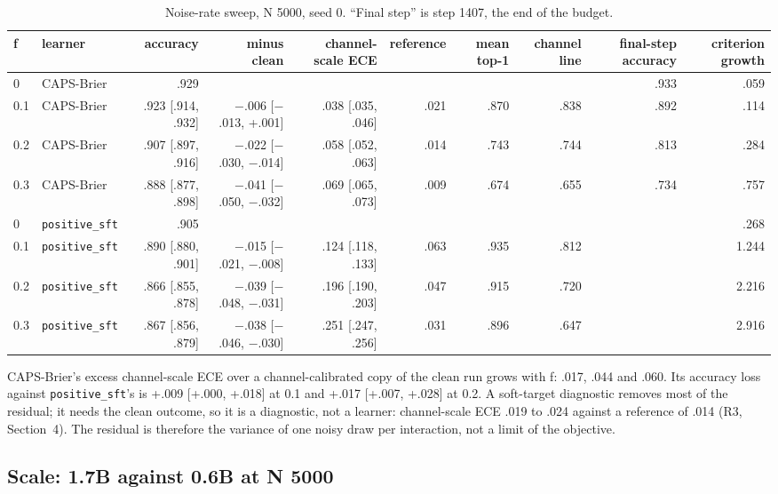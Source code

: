 \documentclass[10pt,letterpaper]{article}
\theoremstyle{plain}
\begin{document}
\begin{table}[H]
\centering
\footnotesize
\setlength{\tabcolsep}{3pt}
\caption{Noise-rate sweep, N 5000, seed 0. ``Final step'' is step 1407, the end of the budget.}
\label{tab:A4}
\begin{adjustbox}{max width=\textwidth}
\begin{tabular}{llrrrrrrrr}
\toprule
f & learner & accuracy & minus clean & channel-scale ECE & reference & mean top-1 & channel line & final-step accuracy & criterion growth \\
\midrule
0 & CAPS-Brier & .929 &  &  &  &  &  & .933 & .059 \\
0.1 & CAPS-Brier & .923 [.914, .932] & $-$.006 [$-$.013, +.001] & .038 [.035, .046] & .021 & .870 & .838 & .892 & .114 \\
0.2 & CAPS-Brier & .907 [.897, .916] & $-$.022 [$-$.030, $-$.014] & .058 [.052, .063] & .014 & .743 & .744 & .813 & .284 \\
0.3 & CAPS-Brier & .888 [.877, .898] & $-$.041 [$-$.050, $-$.032] & .069 [.065, .073] & .009 & .674 & .655 & .734 & .757 \\
0 & \texttt{positive\_sft} & .905 &  &  &  &  &  &  & .268 \\
0.1 & \texttt{positive\_sft} & .890 [.880, .901] & $-$.015 [$-$.021, $-$.008] & .124 [.118, .133] & .063 & .935 & .812 &  & 1.244 \\
0.2 & \texttt{positive\_sft} & .866 [.855, .878] & $-$.039 [$-$.048, $-$.031] & .196 [.190, .203] & .047 & .915 & .720 &  & 2.216 \\
0.3 & \texttt{positive\_sft} & .867 [.856, .879] & $-$.038 [$-$.046, $-$.030] & .251 [.247, .256] & .031 & .896 & .647 &  & 2.916 \\
\bottomrule
\end{tabular}
\end{adjustbox}
\end{table}

CAPS-Brier's excess channel-scale ECE over a channel-calibrated copy of the clean run grows with f: .017, .044 and .060. Its accuracy loss against \texttt{positive\_sft}'s is +.009 [+.000, +.018] at 0.1 and +.017 [+.007, +.028] at 0.2. A soft-target diagnostic removes most of the residual; it needs the clean outcome, so it is a diagnostic, not a learner: channel-scale ECE .019 to .024 against a reference of .014 (R3, Section~4). The residual is therefore the variance of one noisy draw per interaction, not a limit of the objective.

\subsection{Scale: 1.7B against 0.6B at N 5000}\label{sec:A5}
\end{document}
